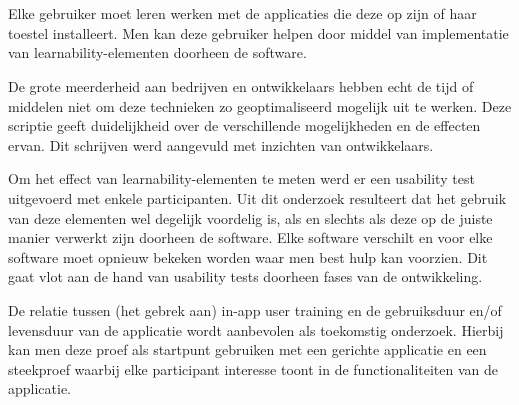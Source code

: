 


\chapter*{}

Elke gebruiker moet leren werken met de applicaties die deze op zijn of haar toestel installeert. Men kan deze gebruiker helpen door middel van implementatie van learnability-elementen doorheen de software.

De grote meerderheid aan bedrijven en ontwikkelaars hebben echt de tijd of middelen niet om deze technieken zo geoptimaliseerd mogelijk uit te werken. Deze scriptie geeft duidelijkheid over de verschillende mogelijkheden en de effecten ervan. Dit schrijven werd aangevuld met inzichten van ontwikkelaars.

Om het effect van learnability-elementen te meten werd er een usability test uitgevoerd met enkele participanten. Uit dit onderzoek resulteert dat het gebruik van deze elementen wel degelijk voordelig is, als en slechts als deze op de juiste manier verwerkt zijn doorheen de software. Elke software verschilt en voor elke software moet opnieuw bekeken worden waar men best hulp kan voorzien. Dit gaat vlot aan de hand van usability tests doorheen fases van de ontwikkeling.

De relatie tussen (het gebrek aan) in-app user training en de gebruiksduur en/of levensduur van de applicatie wordt aanbevolen als toekomstig onderzoek. Hierbij kan men deze proef als startpunt gebruiken met een gerichte applicatie en een steekproef waarbij elke participant interesse toont in de functionaliteiten van de applicatie.
